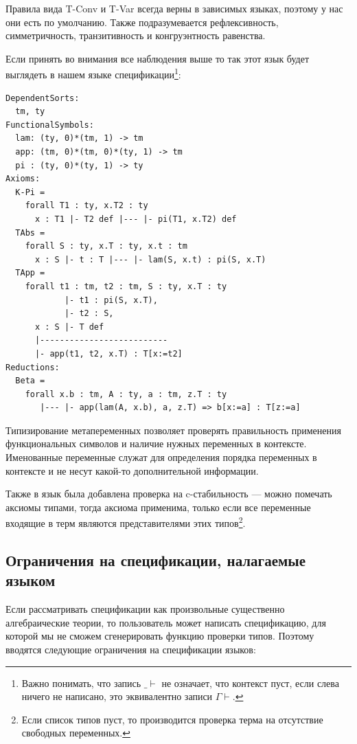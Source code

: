Правила вида T-Conv и T-Var всегда верны в зависимых языках, поэтому у нас они есть по умолчанию. Также подразумевается рефлексивность, симметричность, транзитивность и конгруэнтность равенства.

Если принять во внимания все наблюдения выше то так этот язык будет выглядеть в нашем языке спецификации\footnote{Важно понимать, что запись $\_ \vdash$ не означает, что контекст пуст, если слева ничего не написано, это эквивалентно записи $\Gamma \vdash$.}:

\begin{lstlisting}[frame=single]
DependentSorts:
  tm, ty
FunctionalSymbols:
  lam: (ty, 0)*(tm, 1) -> tm
  app: (tm, 0)*(tm, 0)*(ty, 1) -> tm
  pi : (ty, 0)*(ty, 1) -> ty
Axioms:
  K-Pi =
    forall T1 : ty, x.T2 : ty
      x : T1 |- T2 def |--- |- pi(T1, x.T2) def
  TAbs =
    forall S : ty, x.T : ty, x.t : tm
      x : S |- t : T |--- |- lam(S, x.t) : pi(S, x.T)
  TApp =
    forall t1 : tm, t2 : tm, S : ty, x.T : ty
            |- t1 : pi(S, x.T),
            |- t2 : S,
      x : S |- T def
      |--------------------------
      |- app(t1, t2, x.T) : T[x:=t2]
Reductions:
  Beta =
    forall x.b : tm, A : ty, a : tm, z.T : ty
       |--- |- app(lam(A, x.b), a, z.T) => b[x:=a] : T[z:=a]
\end{lstlisting}

Типизирование метапеременных позволяет проверять правильность применения функциональных символов и наличие нужных переменных в контексте. Именованные переменные служат для определения порядка переменных в контексте и не несут какой-то дополнительной информации.

Также в язык была добавлена проверка на c-стабильность --- можно помечать аксиомы типами, тогда аксиома применима, только если все переменные входящие в терм являются представителями этих типов\footnote{Если список типов пуст, то производится проверка терма на отсутствие свободных переменных.}.

\subsection{Ограничения на спецификации, налагаемые языком}\label{constraints}
Если рассматривать спецификации как произвольные существенно алгебраические теории, то пользователь может написать спецификацию, для которой мы не сможем сгенерировать функцию проверки типов. Поэтому вводятся следующие ограничения на спецификации языков:

